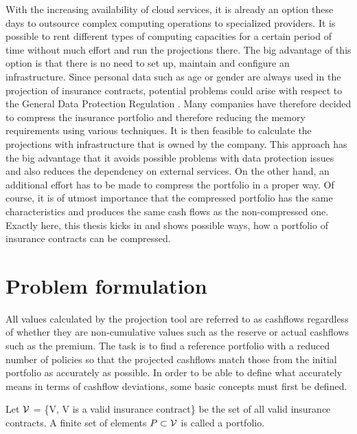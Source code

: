With the increasing availability of cloud services, it is already an option these days to outsource complex computing operations to specialized providers. It is possible to rent different types of computing capacities for a certain period of time without much effort and run the projections there. The big advantage of this option is that there is no need to set up, maintain and configure an infrastructure. Since personal data such as age or gender are always used in the projection of insurance contracts, potential problems could arise with respect to the General Data Protection Regulation \cite{datenschutz}. Many companies have therefore decided to compress the insurance portfolio and therefore reducing the memory requirements using various techniques. It is then feasible to calculate the projections with infrastructure that is owned by the company. This approach has the big advantage that it avoids possible problems with data protection issues and also reduces the dependency on external services. On the other hand, an additional effort has to be made to compress the portfolio in a proper way. Of course, it is of utmost importance that the compressed portfolio has the same characteristics and produces the same cash flows as the non-compressed one. Exactly here, this thesis kicks in and shows possible ways, how a portfolio of insurance contracts can be compressed. 

\section{Problem formulation}
All values calculated by the projection tool are referred to as cashflows regardless of whether they are non-cumulative values such as the reserve or actual cashflows such as the premium. The task is to find a reference portfolio with a reduced number of policies so that the projected cashflows match those from the initial portfolio as accurately as possible. In order to be able to define what accurately means in terms of cashflow deviations, some basic concepts must first be defined. 

\begin{definition}
	Let $\mathcal{V}$ = \{V, V is a valid insurance contract\} be the set of all valid insurance contracts. A finite set of elements $P \subset \mathcal{V}$ is called a portfolio. 
\end{definition}

